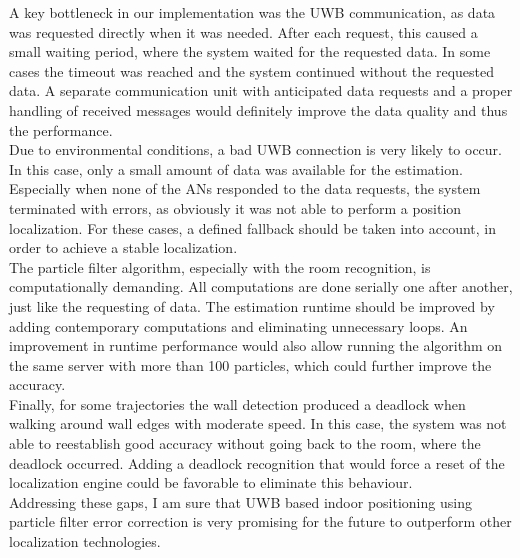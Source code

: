 A key bottleneck in our implementation was the UWB communication, as data was requested directly when it was needed. After each request, this caused a small waiting period, where the system waited for the requested data. In some cases the timeout was reached and the system continued without the requested data. A separate communication unit with anticipated data requests and a proper handling of received messages would definitely improve the data quality and thus the performance.\\
\noindent\hspace*{5mm}%
Due to environmental conditions, a bad UWB connection is very likely to occur. In this case, only a small amount of data was available for the estimation. Especially when none of the ANs responded to the data requests, the system terminated with errors, as obviously it was not able to perform a position localization. For these cases, a defined fallback should be taken into account, in order to achieve a stable localization.\\
\noindent\hspace*{5mm}%
The particle filter algorithm, especially with the room recognition, is computationally demanding. All computations are done serially one after another, just like the requesting of data. The estimation runtime should be improved by adding contemporary computations and eliminating unnecessary loops. An improvement in runtime performance would also allow running the algorithm on the same server with more than 100 particles, which could further improve the accuracy.\\
\noindent\hspace*{5mm}%
Finally, for some trajectories the wall detection produced a deadlock when walking around wall edges with moderate speed. In this case, the system was not able to reestablish good accuracy without going back to the room, where the deadlock occurred. Adding a deadlock recognition that would force a reset of the localization engine could be favorable to eliminate this behaviour.\\
\noindent\hspace*{5mm}%
Addressing these gaps, I am sure that UWB based indoor positioning using particle filter error correction is very promising for the future to outperform other localization technologies.